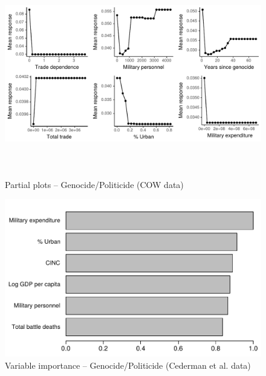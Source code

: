 \begin{figure}[H]
    \centering
    \includegraphics[width=\textwidth, height=9cm]{images/drfdpp6a.pdf}
    \caption{Partial plots -- Genocide/Politicide (COW data)}
    \label{fig:my_label}
\end{figure}

\begin{figure}[H]
    \centering
    \includegraphics{images/drf-gp3.pdf}
    \caption{Variable importance -- Genocide/Politicide (Cederman et al. data)}
    \label{fig:my_label}
\end{figure}

